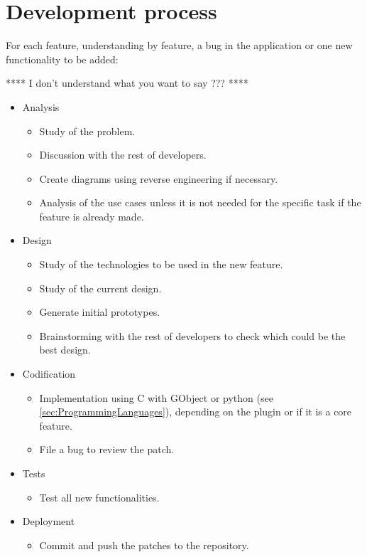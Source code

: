 
\chapter{Development process}


For each feature, understanding by feature, a bug in the application or one new functionality to be added:

**** I don't understand what you want to say ??? ****




\begin{itemize}
  \item Analysis
    \begin{itemize}
      \item Study of the problem.
      \item Discussion with the rest of developers.
      \item Create diagrams using reverse engineering if necessary.
      \item Analysis of the use cases unless it is not needed for the specific task if the feature is already made.
    \end{itemize}
  \item Design
    \begin{itemize}
      \item Study of the technologies to be used in the new feature.
      \item Study of the current design.
      \item Generate initial prototypes.
      \item Brainstorming with the rest of developers to check which could be the best design.
    \end{itemize}
  \item Codification
    \begin{itemize}
      \item Implementation using C with GObject or python (see \ref{sec:ProgrammingLanguages}), depending on the plugin or if it is a core feature.
      \item File a bug to review the patch.
    \end{itemize}
  \newpage
  \item Tests
    \begin{itemize}
      \item Test all new functionalities.
    \end{itemize}
  \item Deployment
    \begin{itemize}
      \item Commit and push the patches to the \GNOME repository.
    \end{itemize}
\end{itemize}

